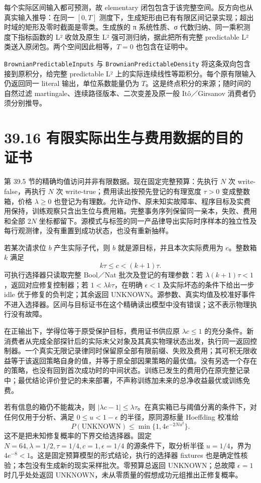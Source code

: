 \documentclass[
  11pt,
  oneside]{book}
\begin{document}
每个实际区间输入都可预测，故 elementary 闭包包含于该完整空间。反方向也从真实输入推导：在同一 \([0,T]\) 测度下，生成矩形由已有有限区间记录实现；超出时域的矩形及零时截面是零类。生成族的 π 系统性质、σ 代数归纳、同一乘积测度下指标函数的 L² 收敛及原生 L² 强可测归纳，据此把所有完整 predictable L² 类送入原闭包。两个空间因此相等，\(T=0\) 也包含在证明中。

\nolinkurl{BrownianPredictableInputs} 与 \nolinkurl{BrownianPredictableDensity} 将这条双向包含接到原积分，给完整 predictable L² 上的实际连续线性等距积分。每个原有限输入仍返回同一 literal 输出，单位系数能量仍为 \(T\)。这是终点积分的来源；随时间的自然过滤 martingale、连续路径版本、二次变差及原一般 Itô／Girsanov 消费者仍须分别推导。

\section{39.16 有限实际出生与费用数据的目的证书}\label{ux6709ux9650ux5b9eux9645ux51faux751fux4e0eux8d39ux7528ux6570ux636eux7684ux76eeux7684ux8bc1ux4e66}

第 39.5 节的精确均值访问并非有限数据。现在固定完整预算：先执行 \(N\) 次 write-false，再执行 \(N\) 次 write-true；费用读出按预先登记的有理宽度 \(\tau>0\) 变成整数箱，价格 \(\lambda\ge0\) 也登记为有理数。允许动作、原未知实故障率、程序目标及实费用保持，训练观察只含出生位与费用箱。完整事务序列保留同一亲本，失败、费用和全部 \(2N\) 坐标都留下。源模式与标签的同一产品律导出实际时序样本的独立性及每行观测律，没有重置到成功状态，也没有重新抽样。

若某次请求位 \(b\) 产生实际子代，则 \(b\) 就是源目标，并且本次实际费用为 \(c\)。整数箱 \(k\) 满足 \[k\tau\le c<(k+1)\tau.\] 可执行选择器只读取完整 Bool／Nat 批次及登记的有理参数：若 \(\lambda(k+1)\tau<1\)，返回对应修复控制器；若 \(1<\lambda k\tau\)，在明确 \(\epsilon<1\) 及实际坏态的条件下给出一步 idle 优于修复的负判定；其余返回 UNKNOWN。源参数、真实均值及校准好事件不进入选择器。区间与目标证书在这个精确读出模型中没有错误；这不表示物理执行没有故障。

在正输出下，学得位等于原受保护目标，费用证书供应原 \(\lambda c\le1\) 的充分条件。新消费者从完成全部探针后的实际末父对象及其真实物理状态出发，执行同一返回控制器。一个真实无限记录律同时保留原全部有限前缀、失败及费用；其可积无限收益等于该返回策略自身的值，并等于原全部因果策略的最优值。没有另选一个存在的策略，也没有回到首次成功时的中间状态。训练已发生的费用仍在原完整记录中；最优结论评价登记的未来部署，不声称训练加未来的总净收益最优或训练免费。

若有信息的箱仍不能裁决，则 \(|\lambda c-1|\le\lambda\tau\)。在真实箱已与阈值分离的条件下，对任何仅用于分析、满足 \(0\le u<1-\epsilon\) 的半径，原同源标量 Hoeffding 校准给 \[P(\mathrm{UNKNOWN})\le\min\{1,4e^{-2Nu^2}\}.\] 这不是把未知修复概率的下界交给选择器。固定 \(N=64,\lambda=1/2,\tau=1/4,c=1,\epsilon=1/4\) 的源条件下，取分析半径 \(u=1/4\)，界为 \(4e^{-8}<1\)。这是固定预算模型的形式结论，执行的选择器 fixtures 也是确定性核验；本包没有生成新的现实采样批次。零预算总返回 UNKNOWN；总故障 \(\epsilon=1\) 时几乎处处返回 UNKNOWN，未从零质量的假想成功元组推出正修复概率。
\end{document}
